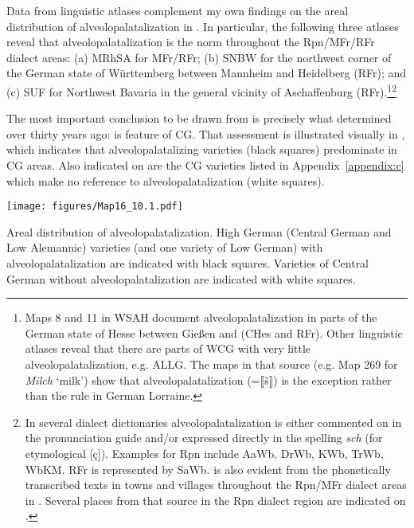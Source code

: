 \begin{xlist}
Data from linguistic atlases complement my own findings on the areal distribution of alveolopalatalization in . In particular, the following three atlases reveal that alveolopalatalization is the norm throughout the Rpn/MFr/RFr dialect areas: (a) MRhSA for MFr/RFr; (b) SNBW for the northwest corner of the German state of  Württemberg between Mannheim and Heidelberg (RFr); and (c) SUF for Northwest Bavaria in the general vicinity of Aschaffenburg (RFr).{\footnote{Maps 8 and 11 in WSAH document alveolopalatalization in parts of the German state of Hesse between Gießen and  (CHes and RFr). Other linguistic atlases reveal that there are parts of WCG with very little alveolopalatalization, e.g. ALLG. The maps in that source (e.g. Map 269 for \textit{Milch} ‘milk’) show that alveolopalatalization (=⟦š⟧) is the exception rather than the rule in German Lorraine.}\footnote{In several dialect dictionaries alveolopalatalization is either commented on in the pronunciation guide and/or expressed directly in the spelling \textit{sch} (for etymological [ç]). Examples for Rpn include AaWb, DrWb, KWb, TrWb, WbKM. RFr is represented by SaWb.  is also evident from the phonetically transcribed texts in towns and villages throughout the Rpn/MFr dialect areas in \citet{CornelissenEtAl1989}. Several places from that source in the Rpn dialect region are indicated on .}}\largerpage

The most important conclusion to be drawn from  is precisely what \citet{Herrgen1986} determined over thirty years ago:  is feature of CG. That assessment is illustrated visually in , which indicates that alveolopalatalizing varieties (black squares) predominate in CG areas. Also indicated on  are the CG varieties listed in Appendix~\ref{appendix:c} which make no reference to alveolopalatalization (white squares).

\begin{map}
\texttt{[image: figures/Map16\_10.1.pdf]}
\caption[Areal distribution of alveolopalatalization]{Areal distribution of alveolopalatalization. High German (Central German and Low Alemannic) varieties (and one variety of Low German) with alveolopalatalization are indicated with black squares. Varieties of Central German without alveolopalatalization are indicated with white squares.}\label{map:16}
\end{map}


\end{xlist}
